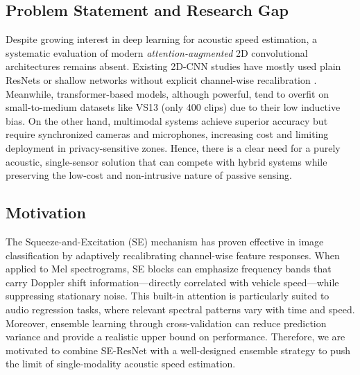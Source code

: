 \documentclass[conference]{IEEEtran}
\begin{document}
\subsection{Problem Statement and Research Gap}
Despite growing interest in deep learning for acoustic speed estimation, a systematic evaluation of modern \textit{attention-augmented} 2D convolutional architectures remains absent. Existing 2D-CNN studies have mostly used plain ResNets or shallow networks without explicit channel-wise recalibration \cite{ref9}. Meanwhile, transformer-based models, although powerful, tend to overfit on small-to-medium datasets like VS13 (only 400 clips) due to their low inductive bias. On the other hand, multimodal systems \cite{ref10} achieve superior accuracy but require synchronized cameras and microphones, increasing cost and limiting deployment in privacy-sensitive zones. Hence, there is a clear need for a purely acoustic, single-sensor solution that can compete with hybrid systems while preserving the low-cost and non-intrusive nature of passive sensing.

\subsection{Motivation}
The Squeeze-and-Excitation (SE) mechanism \cite{ref12} has proven effective in image classification by adaptively recalibrating channel-wise feature responses. When applied to Mel spectrograms, SE blocks can emphasize frequency bands that carry Doppler shift information—directly correlated with vehicle speed—while suppressing stationary noise. This built-in attention is particularly suited to audio regression tasks, where relevant spectral patterns vary with time and speed. Moreover, ensemble learning through cross-validation can reduce prediction variance and provide a realistic upper bound on performance. Therefore, we are motivated to combine SE-ResNet with a well-designed ensemble strategy to push the limit of single-modality acoustic speed estimation.
\end{document}
